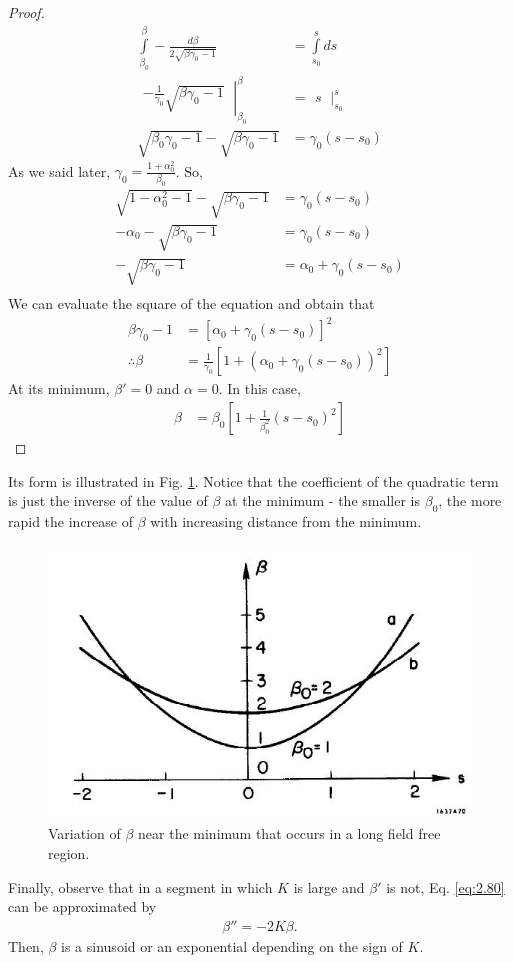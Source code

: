 \begin{proof}
	\begin{align*}
		\int\limits_{\beta_0}^{\beta}-\frac{d\beta}{2\sqrt{\beta\gamma_0 -1}} &= \int\limits_{s_0}^{s}ds\\
		\left.\begin{matrix}
		-\frac{1}{\gamma_0}\sqrt{\beta\gamma_0-1}
		\end{matrix}\ \right|^\beta_{\beta_0} &= \left.\begin{matrix}
				s
				\end{matrix}\ \right|^s_{s_0}\\
		\sqrt{\beta_0\gamma_0-1}-\sqrt{\beta\gamma_0-1} &= \gamma_0(s-s_0)
	\end{align*}
	As we said later, $\gamma_0 = \frac{1+\alpha_0^2}{\beta_0}$. So,
	\begin{align*}
		\sqrt{1-\alpha_0^2-1}-\sqrt{\beta\gamma_0-1} &= \gamma_0(s-s_0)\\
		-\alpha_0-\sqrt{\beta\gamma_0-1} &= \gamma_0(s-s_0)\\
		-\sqrt{\beta\gamma_0-1} &= \alpha_0+\gamma_0(s-s_0)\\
	\end{align*}
	We can evaluate the square of the equation and obtain that
	\begin{align*}
		\beta\gamma_0-1 &= [\alpha_0+\gamma_0(s-s_0)]^2\\
		\therefore \beta &= \frac{1}{\gamma_0}[1+(\alpha_0+\gamma_0(s-s_0))^2]
	\end{align*}
	At its minimum, $\beta'=0$ and $\alpha=0$. In this case,
	\begin{align*}
		\beta &= \beta_0\left[1+\frac{1}{\beta_0^2}(s-s_0)^2\right]
	\end{align*}
\end{proof}

Its form is illustrated in Fig. \ref{fig:fig20}. Notice that the coefficient of the quadratic term is just the inverse of the value of $\beta$ at the minimum - the smaller is $\beta_0$, the more rapid the increase of $\beta$ with increasing distance from the minimum.

\begin{figure}[!htb]
	\centering
	\includegraphics[width=0.8\linewidth]{./Figuras/fig20.jpeg}
	\caption{Variation of $\beta$ near the minimum that occurs in a long field free region.}
	\label{fig:fig20}
\end{figure}

Finally, observe that in a segment in which $K$ is large and $\beta'$ is not, Eq. \eqref{eq:2.80} can be approximated by
\begin{align}
	\beta'' = -2 K \beta.
\end{align}
Then, $\beta$ is a sinusoid or an exponential depending on the sign of $K$.
